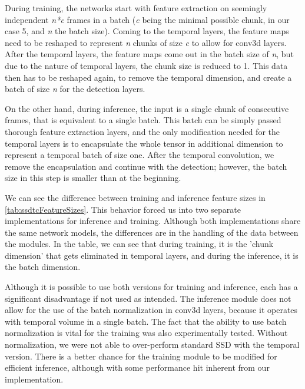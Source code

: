 During training, the networks start with feature extraction on seemingly independent \textit{n*c} frames in a batch (\textit{c} being the minimal possible chunk, in our case 5, and \textit{n} the batch size). Coming to the temporal layers, the feature maps need to be reshaped to represent \textit{n} chunks of size \textit{c} to allow for conv3d layers. After the temporal layers, the feature maps come out in the batch size of \textit{n}, but due to the nature of temporal layers, the chunk size is reduced to 1. This data then has to be reshaped again, to remove the temporal dimension, and create a batch of size \textit{n} for the detection layers.  

On the other hand, during inference, the input is a single chunk of consecutive frames, that is equivalent to a single batch. This batch can be simply passed thorough feature extraction layers, and the only modification needed for the temporal layers is to encapsulate the whole tensor in additional dimension to represent a temporal batch of size one. After the temporal convolution, we remove the encapsulation and continue with the detection; however, the batch size in this step is smaller than at the beginning. 

We can see the difference between training and inference feature sizes in \cref{tab:ssdtcFeatureSizes}. This behavior forced us into two separate implementations for inference and training. Although both implementations share the same network models, the differences are in the handling of the data between the modules. In the table, we can see that during training, it is the 'chunk dimension' that gets eliminated in temporal layers, and during the inference, it is the batch dimension. 

Although it is possible to use both versions for training and inference, each has a significant disadvantage if not used as intended. The inference module does not allow for the use of the batch normalization in conv3d layers, because it operates with temporal volume in a single batch. The fact that the ability to use batch normalization is vital for the training was also experimentally tested. Without normalization, we were not able to over-perform standard SSD with the temporal version. There is a better chance for the training module to be modified for efficient inference, although with some performance hit inherent from our implementation. 

